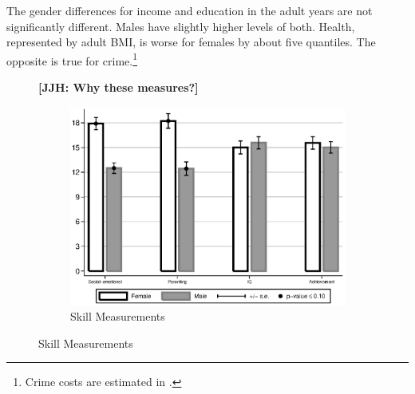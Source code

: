 The gender differences for income and education in the adult years are not significantly different. Males have slightly higher levels of both. Health, represented by adult BMI, is worse for females by about five quantiles. The opposite is true for crime.\footnote{Crime costs are estimated in \citet{Garcia_Heckman_Leaf_etal_2017_Comp_CBA_Unpublished}.}

\begin{figure}[!htbp]
\textbf{[JJH: Why these measures?]}
\centering
\caption{Differences Between ABC/CARE Males and Females}
\label{fig:intro-gdiff-plots}
\begin{subfigure}[h]{0.55\textwidth}
	\centering
	\caption{Skill Measurements}
	\label{fig:intro-skills-plots-skills}
	\includegraphics[width=\textwidth]{output/abccare-gdiff-skills}
\end{subfigure}


\end{figure}
